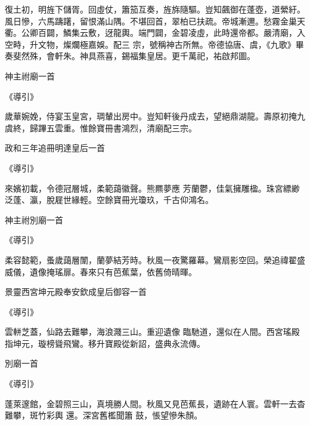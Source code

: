 \begin{pinyinscope}
 復土初，明旌下儲胥。回虛仗，簫笳互奏，旌旆隨驅。豈知飆御在蓬壺，道縈紆。風日慘，六馬躊躇，留恨滿山隅。不堪回首，翠柏已扶疏。帝城漸邇。愁霧金巢天衢。公卿百闢，鱗集云敷，迓龍輿。端門闢，金碧凌虛，此時還帝都。嚴清廟，入空畤，升文物，燦爛極嘉娛。配三
 宗，號稱神古所無。帝德協唐、虞，《九歌》畢奏斐然殊，會軒朱。神具燕喜，錫福集皇居。更千萬祀，祐啟邦圖。



 神主祔廟一首



 《導引》



 歲華婉娩，侍宴玉皇宮，琱輦出房中。豈知軒後丹成去，望絕鼎湖龍。壽原初掩九虞終，歸蹕五雲重。惟餘寶冊書鴻烈，清廟配三宗。



 政和三年追冊明達皇后一首



 《導引》



 來嬪初載，令德冠層城，柔範藹徽聲。熊羆夢應
 芳蘭鬱，佳氣擁雕楹。珠宮縹緲泛蓬、瀛，脫屣世緣輕。空餘寶冊光瓊玖，千古仰鴻名。



 神主祔別廟一首



 《導引》



 柔容懿範，蚤歲藹層闈，蘭夢結芳時。秋風一夜驚羅幕。鸞扇影空回。榮追禕翟盛威儀，遺像掩瑤扉。春來只有芭蕉葉，依舊倚晴暉。



 景靈西宮坤元殿奉安欽成皇后御容一首



 《導引》



 雲軿芝蓋，仙路去難攀，海浪濺三山。重迎遺像
 臨馳道，還似在人間。西宮瑤殿指坤元，璇榜聳飛鸞。移升寶殿從新詔，盛典永流傳。



 別廟一首



 《導引》



 蓬萊邃館，金碧照三山，真境勝人間。秋風又見芭蕉長，遺跡在人寰。雲軒一去杳難攀，斑竹彩輿
 還。深宮舊檻聞簫
 鼓，悵望慘朱顏。



\end{pinyinscope}
